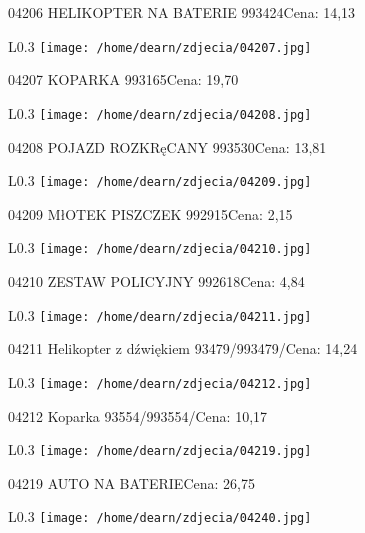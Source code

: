 04206 HELIKOPTER NA BATERIE                           993424Cena: 14,13\newline
\begin{wrapfigure}{L}{0.3\textwidth}
\texttt{[image: /home/dearn/zdjecia/04207.jpg]}
\end{wrapfigure}
04207 KOPARKA                                         993165Cena: 19,70\newline
\begin{wrapfigure}{L}{0.3\textwidth}
\texttt{[image: /home/dearn/zdjecia/04208.jpg]}
\end{wrapfigure}
04208 POJAZD ROZKRęCANY                               993530Cena: 13,81\newline
\begin{wrapfigure}{L}{0.3\textwidth}
\texttt{[image: /home/dearn/zdjecia/04209.jpg]}
\end{wrapfigure}
04209 MłOTEK PISZCZEK                                 992915Cena: 2,15\newline
\begin{wrapfigure}{L}{0.3\textwidth}
\texttt{[image: /home/dearn/zdjecia/04210.jpg]}
\end{wrapfigure}
04210 ZESTAW POLICYJNY                                992618Cena: 4,84\newline
\begin{wrapfigure}{L}{0.3\textwidth}
\texttt{[image: /home/dearn/zdjecia/04211.jpg]}
\end{wrapfigure}
04211 Helikopter z dźwiękiem 93479/993479/Cena: 14,24\newline
\begin{wrapfigure}{L}{0.3\textwidth}
\texttt{[image: /home/dearn/zdjecia/04212.jpg]}
\end{wrapfigure}
04212 Koparka 93554/993554/Cena: 10,17\newline
\begin{wrapfigure}{L}{0.3\textwidth}
\texttt{[image: /home/dearn/zdjecia/04219.jpg]}
\end{wrapfigure}
04219 AUTO NA BATERIECena: 26,75\newline
\begin{wrapfigure}{L}{0.3\textwidth}
\texttt{[image: /home/dearn/zdjecia/04240.jpg]}
\end{wrapfigure}
